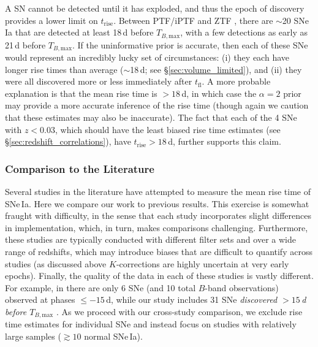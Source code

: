 \documentclass[twocolumn]{./aastex63}
\newcommand{\tfl}{$t_\mathrm{fl}$}
\newcommand{\trise}{$t_\mathrm{rise}$}
\newcommand{\tbmax}{$T_{B,\mathrm{max}}$}
\begin{document}
A SN cannot be detected until it has exploded, and thus the epoch of discovery
provides a lower limit on \trise. Between PTF/iPTF \citep{Papadogiannakis19}
and ZTF \citep{Yao19}, there are $\sim$20 SNe\,Ia that are detected at least
18\,d before \tbmax, with a few detections as early as 21\,d before \tbmax. If
the uninformative prior is accurate, then each of these SNe would represent an
incredibly lucky set of circumstances: (i) they each have longer rise times
than average ($\sim$18\,d; see \S\ref{sec:volume_limited}), and (ii) they were
all discovered more or less immediately after \tfl. A more probable
explanation is that the mean rise time is $> 18$\,d, in which case the $\alpha
= 2$ prior may provide a more accurate inference of the rise time (though
again we caution that these estimates may also be inaccurate). The fact that
each of the 4 SNe with $z < 0.03$, which should have the least biased rise
time estimates (see \S\ref{sec:redshift_correlations}), have \trise$ > 18$\,d,
further supports this claim.

\subsubsection{Comparison to the Literature}

Several studies in the literature have attempted to measure the mean rise time
of SNe\,Ia. Here we compare our work to previous results. This exercise is
somewhat fraught with difficulty, in the sense that each study incorporates
slight differences in implementation, which, in turn, makes comparisons
challenging. Furthermore, these studies are typically conducted with different
filter sets and over a wide range of redshifts, which may introduce biases
that are difficult to quantify across studies (as discussed above
$K$-corrections are highly uncertain at very early epochs). Finally, the
quality of the data in each of these studies is vastly different. For example,
in \citet{Riess99a} there are only 6 SNe (and 10 total $B$-band observations)
observed at phases $\le -15$\,d, while our study includes 31 SNe
\textit{discovered $> 15$\,d before \tbmax} \citep{Yao19}. As we proceed with
our cross-study comparison, we exclude rise time estimates for individual SNe
and instead focus on studies with relatively large samples ($\gtrsim 10$
normal SNe\,Ia).
\end{document}
